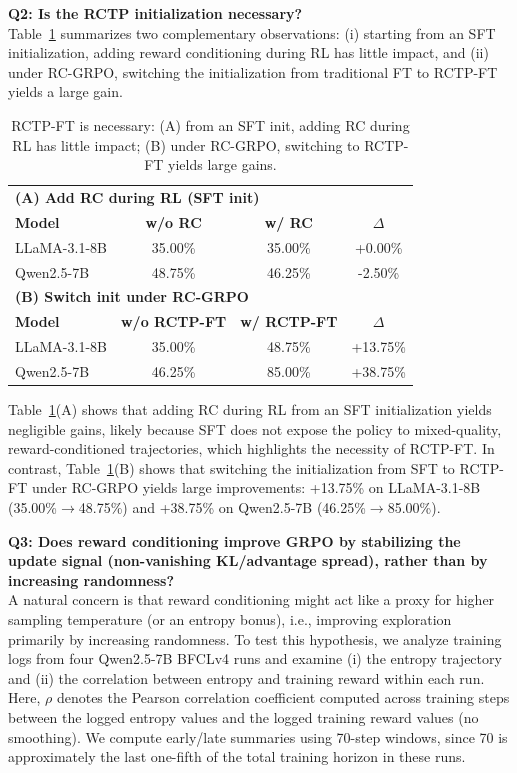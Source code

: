 \documentclass{article}
\theoremstyle{plain}
\theoremstyle{definition}
\theoremstyle{remark}
\begin{document}
\textbf{Q2: Is the RCTP initialization necessary?} \\
Table~\ref{tab:ablation_rctp_init} summarizes two complementary observations: (i) starting from an SFT initialization, adding reward conditioning during RL has little impact, and (ii) under RC-GRPO, switching the initialization from traditional FT to RCTP-FT yields a large gain.

\begin{table}[ht]
\centering
\caption{RCTP-FT is necessary: (A) from an SFT init, adding RC during RL has little impact; (B) under RC-GRPO, switching to RCTP-FT yields large gains.}
\label{tab:ablation_rctp_init}
\small
\begin{tabular*}{\columnwidth}{@{\extracolsep{\fill}}lccc}
\toprule
\multicolumn{4}{l}{\textbf{(A) Add RC during RL (SFT init)}} \\
\textbf{Model} & \textbf{w/o RC} & \textbf{w/ RC} & \textbf{$\Delta$} \\
\midrule
LLaMA-3.1-8B & 35.00\% & 35.00\% & +0.00\% \\
Qwen2.5-7B & 48.75\% & 46.25\% & -2.50\% \\
\midrule
\multicolumn{4}{l}{\textbf{(B) Switch init under RC-GRPO}} \\
\textbf{Model} & \textbf{w/o RCTP-FT} & \textbf{w/ RCTP-FT} & \textbf{$\Delta$} \\
\midrule
LLaMA-3.1-8B & 35.00\% & 48.75\% & +13.75\% \\
Qwen2.5-7B & 46.25\% & 85.00\% & +38.75\% \\
\bottomrule
\end{tabular*}
\end{table}

Table~\ref{tab:ablation_rctp_init}(A) shows that adding RC during RL from an SFT initialization yields negligible gains, likely because SFT does not expose the policy to mixed-quality, reward-conditioned trajectories, which highlights the necessity of RCTP-FT. In contrast, Table~\ref{tab:ablation_rctp_init}(B) shows that switching the initialization from SFT to RCTP-FT under RC-GRPO yields large improvements: +13.75\% on LLaMA-3.1-8B (35.00\%$\to$48.75\%) and +38.75\% on Qwen2.5-7B (46.25\%$\to$85.00\%).

\textbf{Q3: Does reward conditioning improve GRPO by stabilizing the update signal (non-vanishing KL/advantage spread), rather than by increasing randomness?} \\
\label{q3}
A natural concern is that reward conditioning might act like a proxy for higher sampling temperature (or an entropy bonus), i.e., improving exploration primarily by increasing randomness.
To test this hypothesis, we analyze training logs from four Qwen2.5-7B BFCLv4 runs and examine (i) the entropy trajectory and (ii) the correlation between entropy and training reward within each run.
Here, $\rho$ denotes the Pearson correlation coefficient computed across training steps between the logged entropy values and the logged training reward values (no smoothing).
We compute early/late summaries using 70-step windows, since 70 is approximately the last one-fifth of the total training horizon in these runs.
\end{document}
